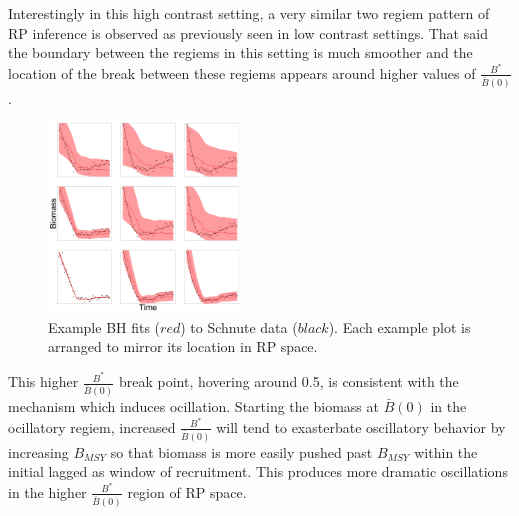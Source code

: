 %
Interestingly in this high contrast setting, a very similar two regiem pattern
of RP inference is observed as previously seen in low contrast settings.
That said the boundary between the regiems in this setting is much smoother
and the location of the break between these regiems appears around higher values of
$\frac{B^*}{\bar B(0)}$. %

%
\begin{figure}
\vspace{-1cm}
\centering
\includegraphics[width=0.45\textwidth]{../ddBias/indexGridExpT45N300A0-1AS10K0.1.png}
\vspace{-0.45cm}
\caption{Example BH fits ($red$) to Schnute data ($black$). Each example plot is arranged to mirror its location in RP space.
}\label{bhGrid}
\end{figure}

%
This higher $\frac{B^*}{\bar B(0)}$ break point, hovering around 0.5, is
consistent with the mechanism which induces ocillation. Starting the biomass
at $\bar B(0)$ in the ocillatory regiem, increased $\frac{B^*}{\bar B(0)}$
will tend to exasterbate oscillatory behavior by increasing $B_{MSY}$ so that
biomass is more easily pushed past $B_{MSY}$ within the initial lagged as
window of recruitment. This produces more dramatic oscillations in the higher
$\frac{B^*}{\bar B(0)}$ region of RP space.

